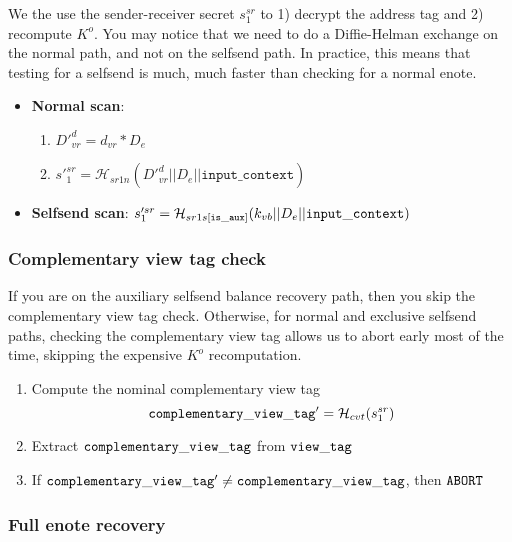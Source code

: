 We the use the sender-receiver secret $s^{sr}_1$ to 1) decrypt the address tag and 2) recompute $K^o$. You may notice that we need to do a Diffie-Helman exchange on the normal path, and not on the selfsend path. In practice, this means that testing for a selfsend is much, much faster than checking for a normal enote.

\begin{itemize}
        \item \textbf{Normal scan}:
        \begin{enumerate}
            \item $D'^d_{vr} = d_{vr} * D_e$
            \item $s'^{sr}_1 = \mathcal{H}_{sr1n}(D'^d_{vr} || D_e || \texttt{input\_context})$
        \end{enumerate}
        \item \textbf{Selfsend scan}: $s'^{sr}_1 = \mathcal{H}_{sr1s[{\tt is\_aux}]}(k_{vb} || D_e || {\tt input\_context})$
\end{itemize}

\subsubsection{Complementary view tag check}
\label{subsubsec:jamtis-balance-recovery-comp-check}

If you are on the auxiliary selfsend balance recovery path, then you skip the complementary view tag check. Otherwise, for normal and exclusive selfsend paths, checking the complementary view tag allows us to abort early most of the time, skipping the expensive $K^o$ recomputation.

\begin{enumerate}
    \item Compute the nominal complementary view tag
    \[{\tt complementary\_view\_tag'} = \mathcal{H}_{cvt}(s^{sr}_1)\]
    \item Extract ${\tt complementary\_view\_tag}$ from ${\tt view\_tag}$
    
    \item If ${\tt complementary\_view\_tag'} \neq {\tt complementary\_view\_tag}$, then ${\tt ABORT}$
\end{enumerate}

\subsubsection{Full enote recovery}
\label{subsubsec:jamtis-balance-recovery-enote}

